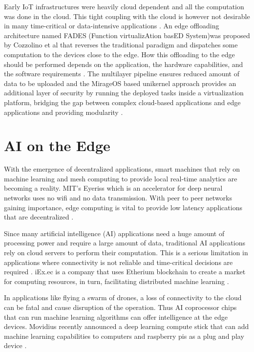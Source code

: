 \documentclass[sigconf]{acmart}
\begin{document}
Early IoT infrastructures were heavily cloud dependent and all the computation was done in the cloud. This tight coupling with the cloud is however not  desirable in many time-critical or data-intensive applications \cite{FADES-offloading}. An edge offloading architecture named FADES (Function virtualizAtion basED System)was proposed by Cozzolino et al that reverses the traditional paradigm and dispatches some computation to the devices close to the edge. How this offloading to the edge should be performed depends on the application, the hardware capabilities, and the software requirements \cite{FADES-offloading}. The multilayer pipeline ensures reduced amount of data to be uploaded and the MirageOS based unikernel approach provides an additional layer of security by running the deployed tasks inside a virtualization platform, bridging the gap between complex cloud-based applications and edge applications and providing modularity \cite{FADES-offloading}.


\section{AI on the Edge}
With the emergence of decentralized applications, smart machines that rely on machine learning and mesh computing to provide local real-time analytics are becoming a reality. MIT's Eyeriss which is an accelerator for deep neural networks uses no wifi and no data transmission. With peer to peer networks gaining importance, edge computing is vital to provide low latency applications that are decentralized \cite{ibm-iot-edge}.

Since many artificial intelligence (AI) applications need a huge amount of processing power and require a large amount of data, traditional AI applications rely on cloud servers to perform their computation. This is a serious limitation in applications where connectivity is not reliable and time-critical decisions are required \cite{ai-to-edge}. iEx.ec is a company that uses Etherium blockchain to create a market for computing resources, in turn, facilitating distributed machine learning \cite{iExec}.

In applications like flying a swarm of drones, a loss of connectivity to the cloud can be fatal and cause disruption of the operation. Thus AI coprocessor chips that can run machine learning algorithms can offer intelligence at the edge devices. Movidius recently announced a deep learning compute stick \cite{movidius} that can add machine learning capabilities to computers and raspberry pis as a plug and play device \cite{ai-to-edge}.
\end{document}
